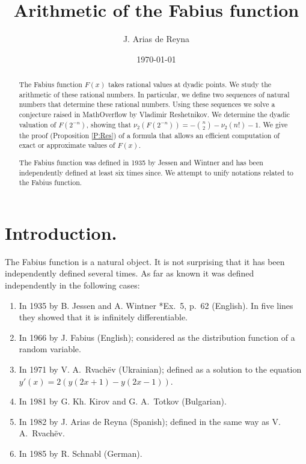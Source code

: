 \documentclass[10pt]{amsart}
\title{Arithmetic of the Fabius function}
\author{J. Arias de Reyna}
\date{\today}
\theoremstyle{definition}
\theoremstyle{remark}
\begin{document}
\newcommand{\N}{{\mathbb N}}
\newcommand{\R}{{\mathbb R}}
\newcommand{\C}{{\mathbb C}}
\newcommand{\Z}{{\mathbb Z}}
\newcommand{\Q}{{\mathbb Q}}
\newcommand{\arctanh}{\mathop{\rm arctanh }}
\def\Re{\operatorname{Re}}
\def\Im{\operatorname{Im}}
\def\Hermite{\operatorname{\mathcal H}}
\def\supp{\operatorname{supp}}
\def\den{\operatorname{den}}

\newcommand{\Orden}{\mathop{\hbox{\cmbsy O}}\nolimits}

\begin{abstract} 
The Fabius function $F(x)$ takes rational values at dyadic points. We study the 
arithmetic of these rational numbers. In particular, we define two sequences
of natural numbers that determine these rational numbers. Using these sequences 
we solve 
a conjecture raised  in MathOverflow by Vladimir Reshetnikov.
We determine the dyadic valuation of $F(2^{-n})$, showing that 
$\nu_2(F(2^{-n}))=-\binom{n}{2}-\nu_2(n!)-1$.
We give the proof  (Proposition \ref{P:Res}) of  a formula that allows an efficient computation 
of exact or approximate values of $F(x)$.  

The Fabius function was defined in 1935 by 
Jessen and Wintner and has been independently defined  at least 
six times since. 
We attempt to unify notations related to the Fabius function. 
\end{abstract}

\maketitle

\section{Introduction.}
The Fabius function is a natural object. It is not surprising that it has been
independently  defined several times. As far as known it was defined independently 
in the following cases:
\begin{enumerate}
\item In 1935 by  B. Jessen and A. Wintner  \cite{MR1501802}*{Ex.~5, p.~62} (English). In five lines
they showed that it is infinitely differentiable.

\item In 1966 by J. Fabius \cite{MR0197656} (English); considered  as the distribution function 
of a random variable. 

\item In 1971 by  V. A.~Rvach{\"e}v   \cite{MR0296237} (Ukrainian); defined 
as a solution to the equation
$y'(x)=2(y(2x+1)-y(2x-1))$.

\item In 1981 by G. Kh. Kirov and G. A.~Totkov \cite{MR705073} (Bulgarian).

\item In 1982 by J. Arias de Reyna \cite{MR666839} (Spanish); defined  in the same way as V. A.~Rvach{\"e}v. 

\item In 1985  by R. Schnabl \cite{MR1031820} (German). 
\end{enumerate}
\end{document}
